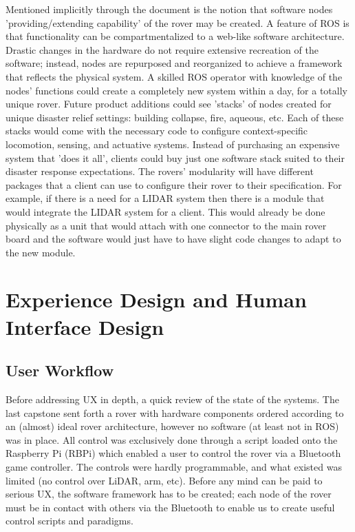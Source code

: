 \documentclass[a4paper, 10pt]{article}
\begin{document}
	Mentioned implicitly through the document is the notion that software nodes 'providing/extending capability' of the rover may be created. A feature of ROS is that functionality can be compartmentalized to a web-like software architecture. Drastic changes in the hardware do not require extensive recreation of the software; instead, nodes are repurposed and reorganized to achieve a framework that reflects the physical system. A skilled ROS operator with knowledge of the nodes' functions could create a completely new system within a day, for a totally unique rover. Future product additions could see 'stacks' of nodes created for unique disaster relief settings: building collapse, fire, aqueous, etc. Each of these stacks would come with the necessary code to configure context-specific locomotion, sensing, and actuative systems. Instead of purchasing an expensive system that 'does it all', clients could buy just one software stack suited to their disaster response expectations. 
	The rovers' modularity will have different packages that a client can use to configure their rover to their specification. For example, if there is a need for a LIDAR system then there is a module that would integrate the LIDAR system for a client. This would already be done physically as a unit that would attach with one connector to the main rover board and the software would just have to have slight code changes to adapt to the new module. 

\pagebreak
	
\section{Experience Design and Human Interface Design}
	\subsection{User Workflow}

	Before addressing UX in depth, a quick review of the state of the systems. The last capstone sent forth a rover with hardware components ordered according to an (almost) ideal rover architecture, however no software (at least not in ROS) was in place. All control was exclusively done through a script loaded onto the Raspberry Pi (RBPi) which enabled a user to control the rover via a Bluetooth game controller. The controls were hardly programmable, and what existed was limited (no control over LiDAR, arm, etc). Before any mind can be paid to serious UX, the software framework has to be created; each node of the rover must be in contact with others via the Bluetooth to enable us to create useful control scripts and paradigms.  
\end{document}
